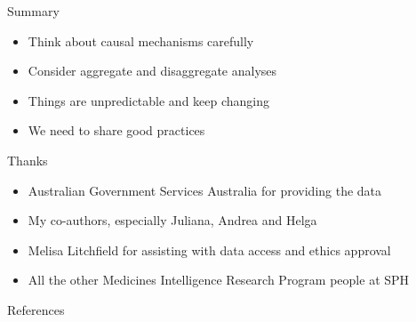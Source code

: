 \documentclass[aspectratio=169,12pt]{beamer} %
\begin{document}
\begin{frame}{Summary}
	\begin{itemize}
		\item Think about causal mechanisms carefully
		\item Consider aggregate and disaggregate analyses
		\item Things are unpredictable and keep changing
		\item We need to share good practices
	\end{itemize}
\end{frame}

\begin{frame}{Thanks}
    \begin{itemize}
        \item Australian Government Services Australia for providing the data
	\item My co-authors, especially Juliana, Andrea and Helga
	\item Melisa Litchfield for assisting with data access and ethics approval
	\item All the other Medicines Intelligence Research Program people at SPH
    \end{itemize}
\end{frame}

\begin{frame}{References}
%        
%        
        \tiny
        
\end{frame}
\end{document}
